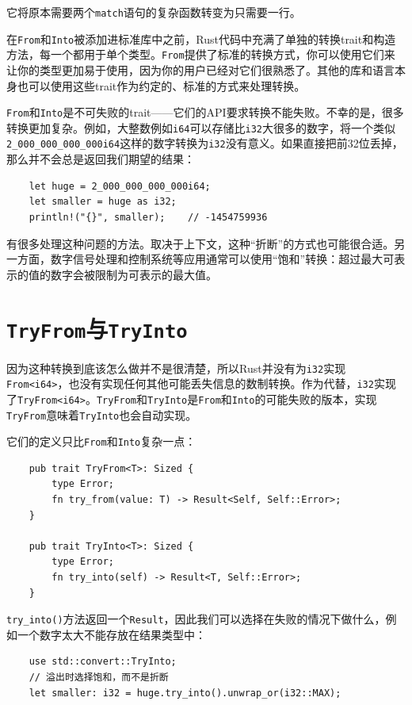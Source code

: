 它将原本需要两个\texttt{match}语句的复杂函数转变为只需要一行。

在\texttt{From}和\texttt{Into}被添加进标准库中之前，Rust代码中充满了单独的转换trait和构造方法，每一个都用于单个类型。\texttt{From}提供了标准的转换方式，你可以使用它们来让你的类型更加易于使用，因为你的用户已经对它们很熟悉了。其他的库和语言本身也可以使用这些trait作为约定的、标准的方式来处理转换。

\texttt{From}和\texttt{Into}是不可失败的trait——它们的API要求转换不能失败。不幸的是，很多转换更加复杂。例如，大整数例如\texttt{i64}可以存储比\texttt{i32}大很多的数字，将一个类似\\
\texttt{2\_000\_000\_000\_000i64}这样的数字转换为\texttt{i32}没有意义。如果直接把前32位丢掉，那么并不会总是返回我们期望的结果：
\begin{verbatim}
    let huge = 2_000_000_000_000i64;
    let smaller = huge as i32;
    println!("{}", smaller);    // -1454759936
\end{verbatim}

有很多处理这种问题的方法。取决于上下文，这种“折断”的方式也可能很合适。另一方面，数字信号处理和控制系统等应用通常可以使用“饱和”转换：超过最大可表示的值的数字会被限制为可表示的最大值。

\section{\texttt{TryFrom}与\texttt{TryInto}}\label{tryfrom}

因为这种转换到底该怎么做并不是很清楚，所以Rust并没有为\texttt{i32}实现\texttt{From<i64>}，也没有实现任何其他可能丢失信息的数制转换。作为代替，\texttt{i32}实现了\texttt{TryFrom<i64>}。\texttt{TryFrom}和\texttt{TryInto}是\texttt{From}和\texttt{Into}的可能失败的版本，实现\texttt{TryFrom}意味着\texttt{TryInto}也会自动实现。

它们的定义只比\texttt{From}和\texttt{Into}复杂一点：
\begin{verbatim}
    pub trait TryFrom<T>: Sized {
        type Error;
        fn try_from(value: T) -> Result<Self, Self::Error>;
    }

    pub trait TryInto<T>: Sized {
        type Error;
        fn try_into(self) -> Result<T, Self::Error>;
    }
\end{verbatim}

\texttt{try\_into()}方法返回一个\texttt{Result}，因此我们可以选择在失败的情况下做什么，例如一个数字太大不能存放在结果类型中：
\begin{verbatim}
    use std::convert::TryInto;
    // 溢出时选择饱和，而不是折断
    let smaller: i32 = huge.try_into().unwrap_or(i32::MAX);
\end{verbatim}

